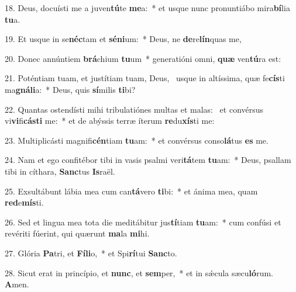 18. Deus, docuísti me a juven\textbf{tú}te \textbf{me}a:~*  et usque nunc pronuntiábo mira\textbf{bí}lia \textbf{tu}a.\

19. Et usque in se\textbf{néc}tam et \textbf{sé}\textbf{ni}um:~*  Deus, ne \textbf{de}re\textbf{lín}quas me,\

20. Donec annúntiem \textbf{brá}chium \textbf{tu}um~*  generatióni omni, \textbf{quæ} ven\textbf{tú}ra est:\

21. Poténtiam tuam, et justítiam tuam, Deus, \dag\  usque in altíssima, quæ fe\textbf{cís}ti ma\textbf{gná}\textbf{li}a:~*  Deus, quis \textbf{sí}milis \textbf{ti}bi?\

22. Quantas ostendísti mihi tribulatiónes multas et malas: \dag\  et convérsus vi\textbf{vi}fi\textbf{cás}\textbf{ti} me:~*  et de abýssis terræ íterum \textbf{re}du\textbf{xís}ti me:\

23. Multiplicásti magnifi\textbf{cén}tiam \textbf{tu}am:~*  et convérsus conso\textbf{lá}tus \textbf{es} me.\

24. Nam et ego confitébor tibi in vasis psalmi veri\textbf{tá}tem \textbf{tu}am:~*  Deus, psallam tibi in cíthara, \textbf{Sanc}tus \textbf{Is}raël.\

25. Exsultábunt lábia mea cum can\textbf{tá}vero \textbf{ti}bi:~*  et ánima mea, quam \textbf{red}e\textbf{mís}ti.\

26. Sed et lingua mea tota die meditábitur jus\textbf{tí}tiam \textbf{tu}am:~*  cum confúsi et revériti fúerint, qui quærunt \textbf{ma}la \textbf{mi}hi.\

27. Glória \textbf{Pa}tri, et \textbf{Fí}\textbf{li}o,~*  et Spi\textbf{rí}tui \textbf{Sanc}to.\

28. Sicut erat in princípio, et \textbf{nunc}, et \textbf{sem}per,~*  et in sǽcula sæcu\textbf{ló}rum. \textbf{A}men.\


